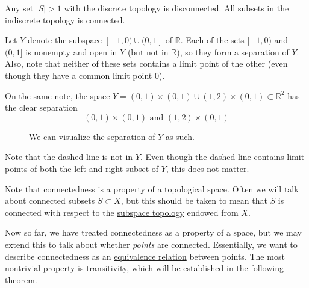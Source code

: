   \begin{example}
    \label{ex:discrete-and-indiscrete-topology}
    Any set $|S| > 1$ with the discrete topology is disconnected. All subsets in the indiscrete topology is connected.  
  \end{example}

  \begin{example}
    \label{ex:disconnected-sets-can-share-limit-points}
 
    Let $Y$ denote the subspace $[-1,0) \cup (0,1]$ of $\mathbb{R}$. Each of the sets $[-1,0)$ and $(0,1]$ is nonempty and open in $Y$ (but not in $\mathbb{R}$), so they form a separation of $Y$. Also, note that neither of these sets contains a limit point of the other (even though they have a common limit point $0$). 

    On the same note, the space $Y = (0,1) \times (0,1) \cup (1,2) \times (0,1) \subset \mathbb{R}^2$ has the clear separation 
    \begin{equation}
      (0, 1) \times (0, 1) \text{ and } (1, 2) \times (0, 1)
    \end{equation}

    \begin{figure}[H]
      \centering 
      \caption{We can visualize the separation of $Y$ as such. } 
      \label{fig:separation_of_rectangle}
    \end{figure}
    Note that the dashed line is not in $Y$. Even though the dashed line contains limit points of both the left and right subset of $Y$, this does not matter. 
  \end{example} 

  Note that connectedness is a property of a topological space. Often we will talk about connected subsets $S \subset X$, but this should be taken to mean that $S$ is connected with respect to the \hyperref[def:subspace-topology]{subspace topology} endowed from $X$.

  Now so far, we have treated connectedness as a property of a space, but we may extend this to talk about whether \textit{points} are connected. Essentially, we want to describe connectedness as an \hyperref[st-def:equivalence_relation]{equivalence relation} between points. The most nontrivial property is transitivity, which will be established in the following theorem. 

